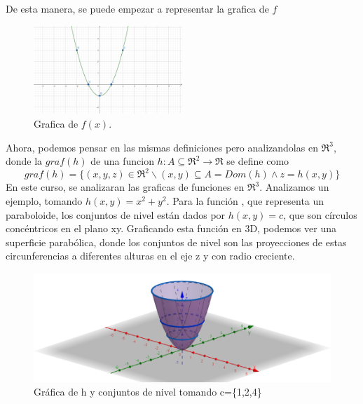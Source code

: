 \begin{definition} [Grafica de $f$]
De esta manera, se puede empezar a representar la grafica de $f$
\begin{figure}[h!] %
    \centering
    \includegraphics[width=0.5\textwidth]{../figs/r2_grafica.png} %
    \caption{Grafica de $f(x)$.}
    \label{fig:ejemplo} %
\end{figure}
\end{definition}
Ahora, podemos pensar en las mismas definiciones pero analizandolas en $\Re^{3}$, donde la $graf (h)$ de una funcion $h: A\subseteq\Re^{2}\rightarrow\Re$ se define como
 \[
graf(h)=\{(x,y,z)\in\Re^2 \backslash (x,y)\subseteq A=Dom(h) \land z=h(x,y) \}
 \]
En este curso, se analizaran las graficas de funciones en  $\Re^{3}$. Analizamos un ejemplo, tomando $h(x,y)=x^2+y^2$.
Para la función , que representa un paraboloide, los conjuntos de nivel están dados por $h(x,y)=c$, que son círculos concéntricos en el plano xy. Graficando esta función en 3D, podemos ver una superficie parabólica, donde los conjuntos de nivel son las proyecciones de estas circunferencias a diferentes alturas en el eje z y con radio creciente.
\begin{figure}[h!] %
    \centering
    \includegraphics[width=1\textwidth]{../figs/r3_grafica.png} %
    \caption{\small{ Gráfica de h y conjuntos de nivel tomando 
    c=\{1,2,4}\}}
    \label{fig:ejemplo} %
\end{figure}

